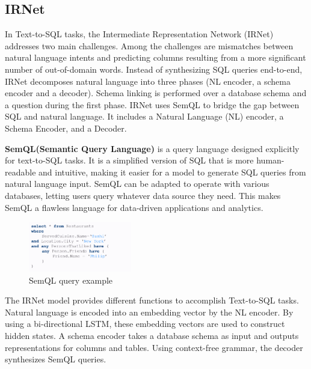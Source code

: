 \subsection{IRNet}


In Text-to-SQL tasks, the Intermediate Representation Network (IRNet)\cite{DBLP:journals/corr/abs-1905-08205} addresses two main challenges.
Among the challenges are mismatches between natural language intents and predicting columns resulting from a more significant number of out-of-domain words.
Instead of synthesizing SQL queries end-to-end, IRNet decomposes natural language into three phases (NL encoder, a schema encoder and a decoder).
Schema linking is performed over a database schema and a question during the first phase.
IRNet uses SemQL to bridge the gap between SQL and natural language.
It includes a Natural Language (NL) encoder, a Schema Encoder, and a Decoder.

\textbf{SemQL(Semantic Query Language)}\cite{semql}  is a query language designed explicitly for text-to-SQL tasks. It is a simplified version of SQL that is more human-readable and intuitive, making it easier for a model to generate SQL queries from natural language input. SemQL can be adapted to operate with various databases, letting users query whatever data source they need. This makes SemQL a flawless language for data-driven applications and analytics.

\begin{figure}[H]
    \centering
    \includegraphics[width=0.4\textwidth]{pics/semql}
    \caption{SemQL query example\cite{2018MDM}}
    \label{fig:semql}
\end{figure}



The IRNet model provides different functions to accomplish Text-to-SQL tasks.
Natural language is encoded into an embedding vector by the NL encoder. By using a bi-directional LSTM, these embedding vectors are used to construct hidden states.
A schema encoder takes a database schema as input and outputs representations for columns and tables.
Using context-free grammar, the decoder synthesizes SemQL queries.

